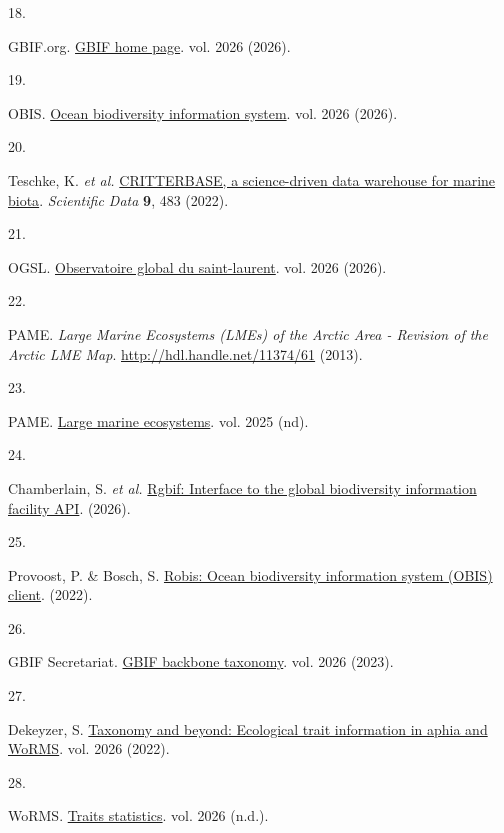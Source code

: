 \documentclass[
  letterpaper,
  DIV=11,
  numbers=noendperiod]{scrartcl}
\newlength{\cslhangindent}
\newlength{\csllabelwidth}
\newenvironment{CSLReferences}[2] %
 {\begin{list}{}{%
  \setlength{\itemindent}{0pt}
  \setlength{\leftmargin}{0pt}
  \setlength{\parsep}{0pt}
  \ifodd #1
   \setlength{\leftmargin}{\cslhangindent}
   \setlength{\itemindent}{-1\cslhangindent}
  \fi
  \setlength{\itemsep}{#2\baselineskip}}}
 {\end{list}}
\newcommand{\CSLLeftMargin}[1]{\parbox[t]{\csllabelwidth}{\strut#1\strut}}
\newcommand{\CSLRightInline}[1]{\parbox[t]{\linewidth - \csllabelwidth}{\strut#1\strut}}
\begin{document}
\begin{CSLReferences}{0}{0}
\CSLLeftMargin{18. }%
\CSLRightInline{GBIF.org. \href{https://www.gbif.org}{GBIF home page}.
vol. 2026 (2026).}

\CSLLeftMargin{19. }%
\CSLRightInline{OBIS. \href{https://obis.org}{Ocean biodiversity
information system}. vol. 2026 (2026).}

\CSLLeftMargin{20. }%
\CSLRightInline{Teschke, K. \emph{et al.}
\href{https://doi.org/10.1038/s41597-022-01590-1}{CRITTERBASE, a
science-driven data warehouse for marine biota}. \emph{Scientific Data}
\textbf{9}, 483 (2022).}

\CSLLeftMargin{21. }%
\CSLRightInline{OGSL. \href{https://slgo.ca}{Observatoire global du
saint-laurent}. vol. 2026 (2026).}

\CSLLeftMargin{22. }%
\CSLRightInline{PAME. \emph{Large Marine Ecosystems (LMEs) of the Arctic
Area - Revision of the Arctic LME Map}.
\url{http://hdl.handle.net/11374/61} (2013).}

\CSLLeftMargin{23. }%
\CSLRightInline{PAME.
\href{https://pame.is/ourwork/ecosystem-approach-to-management-ea/large-marine-ecosystems/}{Large
marine ecosystems}. vol. 2025 (nd).}

\CSLLeftMargin{24. }%
\CSLRightInline{Chamberlain, S. \emph{et al.}
\href{https://CRAN.R-project.org/package=rgbif}{Rgbif: Interface to the
global biodiversity information facility API}. (2026).}

\CSLLeftMargin{25. }%
\CSLRightInline{Provoost, P. \& Bosch, S.
\href{https://CRAN.R-project.org/package=robis}{Robis: Ocean
biodiversity information system (OBIS) client}. (2022).}

\CSLLeftMargin{26. }%
\CSLRightInline{GBIF Secretariat.
\href{https://doi.org/10.15468/39omei}{GBIF backbone taxonomy}. vol.
2026 (2023).}

\CSLLeftMargin{27. }%
\CSLRightInline{Dekeyzer, S.
\href{https://www.marinespecies.org/news.php?p=show&id=9034}{Taxonomy
and beyond: Ecological trait information in aphia and WoRMS}. vol. 2026
(2022).}

\CSLLeftMargin{28. }%
\CSLRightInline{WoRMS.
\href{https://marinespecies.org/traits/aphia.php?p=stats_attributes}{Traits
statistics}. vol. 2026 (n.d.).}


\end{CSLReferences}
\end{document}
